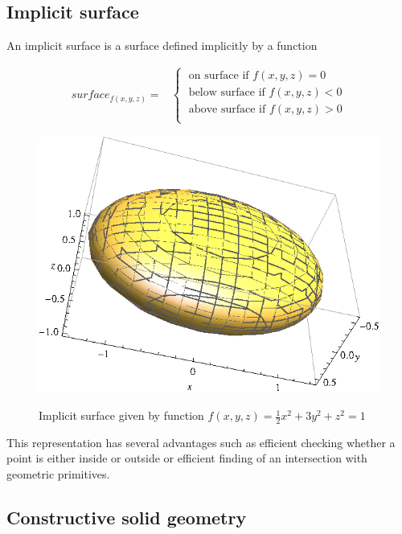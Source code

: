\subsection{Implicit surface}
An implicit surface is a surface defined implicitly by a function

\begin{equation}
\begin{split}
surface_{f(x,y,z)} =
  &\left\{\;
    \begin{split}
      \text{on surface if }f(x,y,z) = 0 \\ 
      \text{below surface if }f(x,y,z) < 0 \\
      \text{above surface if }f(x,y,z) > 0 \\
    \end{split}
  \right.
\end{split}
\end{equation}

\begin{figure}[H]
\centering
\includegraphics[scale=1]{../img/implicit_surface.eps}
\label{fig:implicit}
\caption{Implicit surface given by function $f(x,y,z) = \frac{1}{2}x^{2} + 3y^{2} + z^{2} = 1$}
\end{figure}


This representation has several advantages such as efficient checking whether a point is either
inside or outside or efficient finding of an intersection with geometric primitives.


\subsection{Constructive solid geometry}

